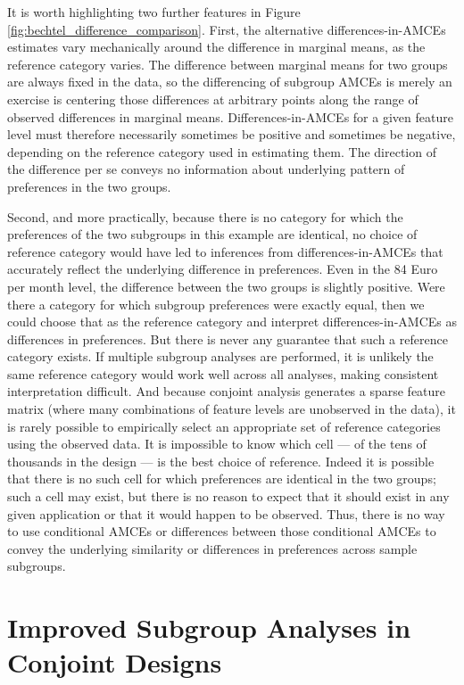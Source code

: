 \documentclass[a4paper,12pt]{article}\usepackage[]{graphicx}\usepackage[]{color}
\begin{document}
It is worth highlighting two further features in Figure \ref{fig:bechtel_difference_comparison}. First, the alternative differences-in-AMCEs estimates vary mechanically around the difference in marginal means, as the reference category varies. The difference between marginal means for two groups are always fixed in the data, so the differencing of subgroup AMCEs is merely an exercise is centering those differences at arbitrary points along the range of observed differences in marginal means. Differences-in-AMCEs for a given feature level must therefore necessarily sometimes be positive and sometimes be negative, depending on the reference category used in estimating them. The direction of the difference per se conveys no information about underlying pattern of preferences in the two groups. 

Second, and more practically, because there is no category for which the preferences of the two subgroups in this example are identical, no choice of reference category would have led to inferences from differences-in-AMCEs that accurately reflect the underlying difference in preferences. Even in the 84 Euro per month level, the difference between the two groups is slightly positive. Were there a category for which subgroup preferences were exactly equal, then we could choose that as the reference category and interpret differences-in-AMCEs as differences in preferences. But there is never any guarantee that such a reference category exists. If multiple subgroup analyses are performed, it is unlikely the same reference category would work well across all analyses, making consistent interpretation difficult. And because conjoint analysis generates a sparse feature matrix (where many combinations of feature levels are unobserved in the data), it is rarely possible to empirically select an appropriate set of reference categories using the observed data. It is impossible to know which cell --- of the tens of thousands in the design --- is the best choice of reference. Indeed it is possible that there is no such cell for which preferences are identical in the two groups; such a cell may exist, but there is no reason to expect that it should exist in any given application or that it would happen to be observed. Thus, there is no way to use conditional AMCEs or differences between those conditional AMCEs to convey the underlying similarity or differences in preferences across sample subgroups.


\section*{Improved Subgroup Analyses in Conjoint Designs}\label{sec:marginalmeans}
\end{document}
